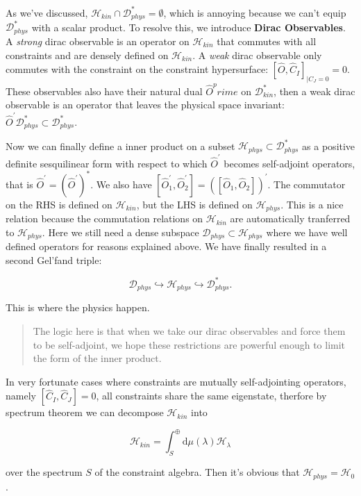 \documentclass{article}
\begin{document}
As we've discussed, $\mathcal{H}_{kin} \cap\mathcal{D}^\ast_{phys} = \emptyset$, which is annoying because we can't equip $\mathcal{D}^\ast_{phys}$ with a scalar product. To resolve this, we introduce \textbf{Dirac Observables}. A \emph{strong} dirac observable is an operator on $\mathcal{H}_{kin}$ that commutes with all constraints and are densely defined on $\mathcal{H}_{kin}$. A \emph{weak} dirac observable only commutes with the constraint on the constraint hypersurface: $[\hat{O},\hat{C}_{I}]_{|C_{J}=0}=0$. These observables also have their natural dual $\hat{O}^prime$ on $\mathcal{D}^\ast_{kin}$, then a weak dirac observable is an operator that leaves the physical space invariant: $\hat{O}^\prime\mathcal{D}^\ast_{phys}\subset \mathcal{D}^\ast_{phys}$.

Now we can finally define a inner product on a subset $\mathcal{H}_{phys}\subset\mathcal{D}^\ast_{phys}$ as a positive definite sesquilinear form with respect to which $\hat{O}^\prime$ becomes self-adjoint operators, that is $\hat{O}^\prime = (\hat{O}^\prime)^\ast$. We also have $[\hat{O}_1^\prime, \hat{O}_2^\prime] = ([\hat{O}_1, \hat{O}_2])^\prime$. The commutator on the RHS is defined on $\mathcal{H}_{kin}$, but the LHS is defined on $\mathcal{H}_{phys}$. This is a nice relation because the commutation relations on $\mathcal{H}_{kin}$ are automatically tranferred to $\mathcal{H}_{phys}$. Here we still need a dense subspace $\mathcal{D}_{phys}\subset\mathcal{H}_{phys}$ where we have well defined operators for reasons explained above. We have finally resulted in a second Gel'fand triple:

$$
\mathcal{D}_{phys}\hookrightarrow \mathcal{H}_{phys}\hookrightarrow \mathcal{D}^\ast_{phys}.
$$

This is where the physics happen.

\begin{quote}
The logic here is that when we take our dirac observables and force them to be self-adjoint, we hope these restrictions are powerful enough to limit the form of the inner product.
\end{quote}

In very fortunate cases where constraints are mutually self-adjointing operators, namely $[\hat{C}_I, \hat{C}_J] = 0$, all constraints share the same eigenstate, therfore by spectrum theorem we can decompose $\mathcal{H}_{kin}$ into

$$
\mathcal{H}_{kin} = \int^\oplus_S\mathrm{d}\mu(\lambda)\mathcal{H}_\lambda
$$

over the spectrum $S$ of the constraint algebra. Then it's obvious that $\mathcal{H}_{phys} = \mathcal{H}_0$.
\end{document}
